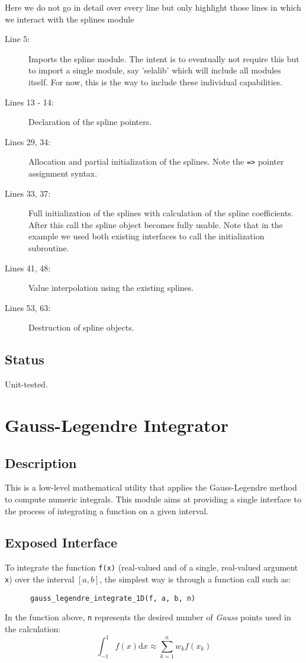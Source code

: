 \documentclass[]{report}   %
\begin{document}
Here we do not go in detail over every line but only highlight those lines in which we interact with the splines module
\begin{description}
\item[Line 5:]
Imports the spline module. The intent is to eventually not require this but to import a single module, say 'selalib' which will include all modules itself. For now, this is the way to include these individual capabilities.

\item[Lines 13 - 14: ]
Declaration of the spline pointers.

\item[Lines 29, 34:]
Allocation and partial initialization of the splines. Note the \verb+=>+ pointer assignment syntax.

\item[Lines 33, 37:]
Full initialization of the splines with calculation of the spline coefficients. After this call the spline object becomes fully usable. Note that in the example we used both existing interfaces to call the initialization subroutine.
\item[Lines 41, 48:]
Value interpolation using the existing splines.

\item[Lines 53, 63:]
Destruction of spline objects.
\end{description}


\subsection{Status}
Unit-tested.

\section{Gauss-Legendre Integrator}

\subsection{Description}
This is a low-level mathematical utility that applies the Gauss-Legendre method to compute numeric integrals.  This module aims at providing a single interface to the process of integrating a function on a given interval.

\subsection{Exposed Interface}
To integrate the function \verb+f(x)+ (real-valued and of a single, real-valued argument \verb+x+) over the interval $[a, b]$, the simplest way is through a function call such as:
 \begin{verbatim}
      gauss_legendre_integrate_1D(f, a, b, n)
 \end{verbatim}
In the function above, \verb+n+ represents the desired number of \emph{Gauss} points used in the calculation:
\begin{equation}
\int_{-1}^1f(x) \mathrm{d} x \approx \sum_{k=1}^n w_kf(x_k)
\end{equation}
\end{document}
